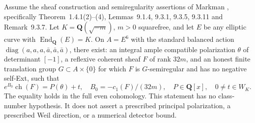 \begin{theorem}
\label{SF-CM03}
Assume the sheaf construction and semiregularity assertions of
Markman \cite{SF-Markman2502}, specifically Theorem~1.4.1(2)--(4),
Lemmas~9.1.4, 9.3.1, 9.3.5, 9.3.11 and Remark~9.3.7.
Let $K=\mathbf Q(\sqrt{-m})$, $m>0$ squarefree, and let $E$ be
any elliptic curve with $\operatorname{End}_{\mathbf Q}(E)=K$.
On $A=E^6$ with the standard balanced action
$\operatorname{diag}(a,a,a,\bar a,\bar a,\bar a)$, there exist:
an integral ample compatible polarization $\theta$ of determinant
$[-1]$, a reflexive coherent sheaf $F$ of rank $32m$, and an honest
finite translation group $G\subset A\times\{0\}$ for which $F$
is $G$-semiregular and has no negative self-Ext, such that
\[
 e^{B_0}\operatorname{ch}(F)=P(\theta)+t,
 \quad B_0=-c_1(F)/(32m),\quad P\in\mathbf Q[x],\quad0\ne t\in W_K.
\]
The equality holds in the full even cohomology. This statement has no
class-number hypothesis. It does not assert a prescribed principal
polarization, a prescribed Weil direction, or a numerical detector
bound.
\end{theorem}

